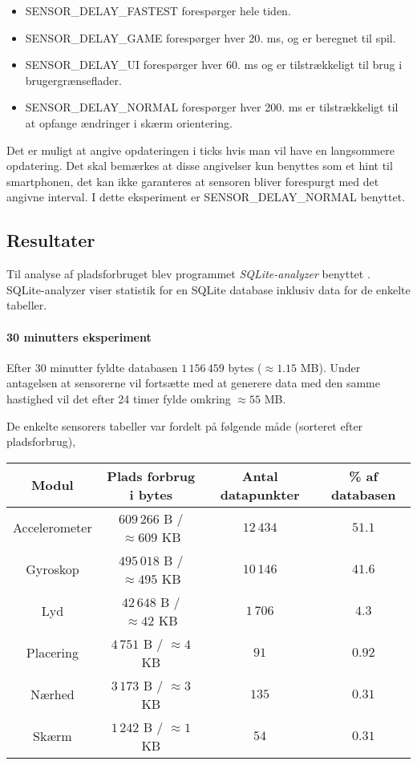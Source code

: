 \begin{itemize}
	\item SENSOR\_DELAY\_FASTEST forespørger hele tiden.
	\item SENSOR\_DELAY\_GAME forespørger hver 20. ms, og er beregnet til spil.
	\item SENSOR\_DELAY\_UI forespørger hver 60. ms og er tilstrækkeligt til brug i brugergrænseflader.
	\item SENSOR\_DELAY\_NORMAL forespørger hver 200. ms er tilstrækkeligt til at opfange ændringer i skærm orientering.
\end{itemize}
Det er muligt at angive opdateringen i ticks hvis man vil have en langsommere opdatering.
Det skal bemærkes at disse angivelser kun benyttes som et hint til smartphonen, det kan ikke garanteres at sensoren bliver forespurgt med det angivne interval.
I dette eksperiment er SENSOR\_DELAY\_NORMAL benyttet.

\subsection{Resultater}
Til analyse af pladsforbruget blev programmet \textit{SQLite-analyzer} benyttet \cite{sqliteanalyzer}.
SQLite-analyzer viser statistik for en SQLite database inklusiv data for de enkelte tabeller.

\paragraph{30 minutters eksperiment}
Efter 30 minutter fyldte databasen $1\,156\,459$ bytes ($\approx1.15$ MB).
Under antagelsen at sensorerne vil fortsætte med at generere data med den samme hastighed vil det efter 24 timer fylde omkring $\approx55$ MB. 

De enkelte sensorers tabeller var fordelt på følgende måde (sorteret efter pladsforbrug),

\begin{tabular}{|c|c|c|c|}
	\hline Modul 			& Plads forbrug i bytes			& Antal datapunkter  & \% af databasen \\
	\hline Accelerometer 	& $609\,266$ B / $\approx609$ KB	& $12\,434$ 		 & $51.1$ \\ 
	\hline Gyroskop 		& $495\,018$ B / $\approx495$ KB	& $10\,146$ 		 & $41.6$\\ 
	\hline Lyd 				& $42\,648$ B / $\approx42$ KB	& $1\,706$ 			 & $4.3$ \\ 
	\hline Placering 		& $4\,751$ B / $\approx4$ KB		& $91$ 				 & $0.92$ \\ 
	\hline Nærhed    		& $3\,173$ B / $\approx3$ KB		& $135$ 			 & $0.31$ \\ 
	\hline Skærm 			& $1\,242$ B / $\approx1$	KB		& $54$				 & $0.31$ \\ 
	\hline 
\end{tabular} 

